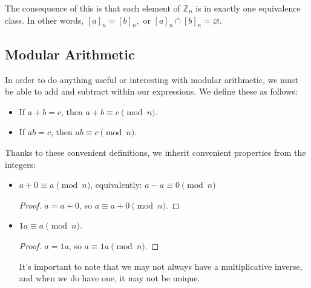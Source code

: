 \documentclass{article}
\begin{document}
The consequence of this is that each element of $\mathbb{Z}_n$ is in exactly one equivalence class. In other words, $[a]_n=[b]_n,$ or $[a]_n\cap [b]_n=\varnothing$.

\subsection{Modular Arithmetic}

In order to do anything useful or interesting with modular arithmetic, we must be able to add and subtract within our expressions. We define these as follows:

\begin{itemize}
    \item If $a+b=c$, then $a+b\equiv c\pmod{n}$.
    \item If $ab=c$, then $ab\equiv c\pmod{n}$.
\end{itemize}
Thanks to these convenient definitions, we inherit convenient properties from the integers:
\begin{itemize}
    \item $a+0\equiv a\pmod{n}$, equivalently: $a-a\equiv 0\pmod{n}$
        \begin{proof} 
            $a=a+0$, so $a\equiv a+0\pmod{n} $.
        \end{proof}
    \item $1a\equiv a\pmod{n}$.
        \begin{proof} 
            $a=1a$, so $a\equiv 1a\pmod{n} $.
        \end{proof}
        It's important to note that we may not always have a multiplicative inverse, and when we do have one, it may not be unique.
\end{itemize}
\end{document}
